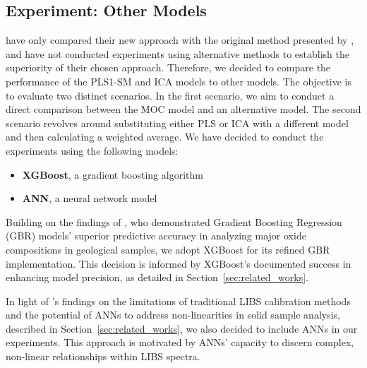 \subsection{Experiment: Other Models}\label{sec:experiment_other_models}
\citet{cleggRecalibrationMarsScience2017} have only compared their new approach with the original method presented by \citet{wiensPreFlight3}, and have not conducted experiments using alternative methods to establish the superiority of their chosen approach.
Therefore, we decided to compare the performance of the PLS1-SM and ICA models to other models.
The objective is to evaluate two distinct scenarios.
In the first scenario, we aim to conduct a direct comparison between the MOC model and an alternative model. The second scenario revolves around substituting either PLS or ICA with a different model and then calculating a weighted average.
We have decided to conduct the experiments using the following models:

\begin{itemize}
	\item \textbf{XGBoost}, a gradient boosting algorithm \cite{chen_xgboost_2016}
	\item \textbf{ANN}, a neural network model
\end{itemize}

Building on the findings of \citet{andersonPostlandingMajorElement2022}, who demonstrated Gradient Boosting Regression (GBR) models' superior predictive accuracy in analyzing major oxide compositions in geological samples, we adopt XGBoost for its refined GBR implementation.
This decision is informed by XGBoost's documented success in enhancing model precision, as detailed in Section~\ref{sec:related_works}.

In light of \citeauthor{takahashi_quantitative_2017}'s findings on the limitations of traditional LIBS calibration methods and the potential of ANNs to address non-linearities in solid sample analysis, described in Section~\ref{sec:related_works}, we also decided to include ANNs in our experiments.
This approach is motivated by ANNs' capacity to discern complex, non-linear relationships within LIBS spectra.

